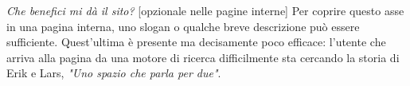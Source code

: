 \textit{Che benefici mi dà il sito?} [opzionale nelle pagine interne] \newline
Per coprire questo asse in una pagina interna, uno slogan o qualche breve descrizione può essere sufficiente. Quest'ultima è presente ma decisamente poco efficace: l'utente che arriva alla pagina da una motore di ricerca difficilmente sta cercando la storia di Erik e Lars, \textit{"Uno spazio che parla per due"}.